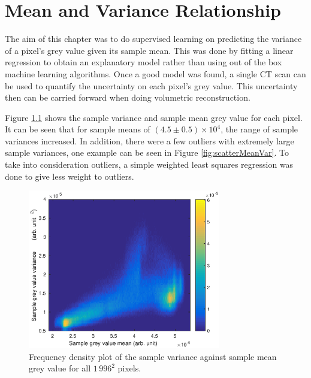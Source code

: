 \documentclass[12pt]{report}
\begin{document}

\chapter{Mean and Variance Relationship}

The aim of this chapter was to do supervised learning on predicting the variance of a pixel's grey value given its sample mean. This was done by fitting a linear regression to obtain an explanatory model rather than using out of the box machine learning algorithms. Once a good model was found, a single CT scan can be used to quantify the uncertainty on each pixel's grey value. This uncertainty then can be carried forward when doing volumetric reconstruction.

Figure \ref{fig:histogramHeatmap} shows the sample variance and sample mean grey value for each pixel. It can be seen that for sample means of $(4.5\pm0.5)\times 10^4$, the range of sample variances increased. In addition, there were a few outliers with extremely large sample variances, one example can be seen in Figure \ref{fig:scatterMeanVar}. To take into consideration outliers, a simple weighted least squares regression was done to give less weight to outliers.

\begin{figure}
	\centering
	\includegraphics[width=0.75\textwidth]{figures/meanVar/histogramHeatmap.eps}
	\caption{Frequency density plot of the sample variance against sample mean grey value for all $1\,996^2$ pixels.}
	\label{fig:histogramHeatmap}
\end{figure}
\end{document}
